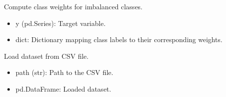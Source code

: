 \documentclass[letterpaper,10pt,english]{sphinxmanual}
\begin{document}
\begin{fulllineitems}
\label{\detokenize{eda:eda.compute_class_weights}}
\pysigstartsignatures
{}
\pysigstopsignatures
\sphinxAtStartPar
Compute class weights for imbalanced classes.
\begin{description}
\begin{itemize}
\item {} 
\sphinxAtStartPar
y (pd.Series): Target variable.

\end{itemize}

\begin{itemize}
\item {} 
\sphinxAtStartPar
dict: Dictionary mapping class labels to their corresponding weights.

\end{itemize}

\end{description}

\end{fulllineitems}


\begin{fulllineitems}
\label{\detokenize{eda:eda.load_dataset}}
\pysigstartsignatures
{}
\pysigstopsignatures
\sphinxAtStartPar
Load dataset from CSV file.
\begin{quote}\begin{description}
\sphinxAtStartPar
{}

\end{description}\end{quote}
\begin{description}
\begin{itemize}
\item {} 
\sphinxAtStartPar
path (str): Path to the CSV file.

\end{itemize}

\begin{itemize}
\item {} 
\sphinxAtStartPar
pd.DataFrame: Loaded dataset.

\end{itemize}

\end{description}

\end{fulllineitems}
\end{document}
